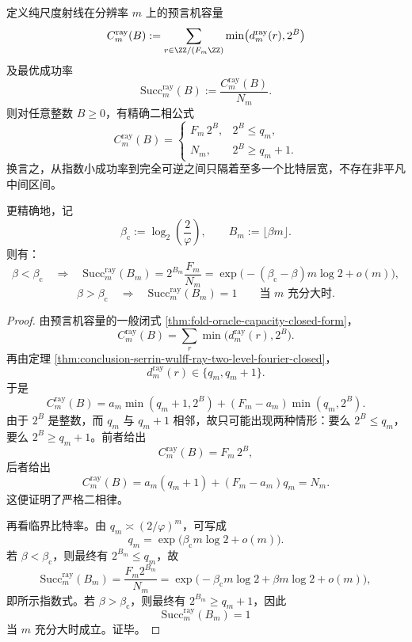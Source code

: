 \begin{theorem}\label{thm:conclusion-serrin-wulff-ray-onebit-capacity-transition}
定义纯尺度射线在分辨率 \(m\) 上的预言机容量
\[
C_m^{\mathrm{ray}}(B)
:=
\sum_{r\in \ZZ/(F_m\ZZ)}
\min\bigl(d_m^{\mathrm{ray}}(r),2^B\bigr)
\]
及最优成功率
\[
\mathrm{Succ}_m^{\mathrm{ray}}(B):=\frac{C_m^{\mathrm{ray}}(B)}{N_m}.
\]
则对任意整数 \(B\ge 0\)，有精确二相公式
\[
C_m^{\mathrm{ray}}(B)=
\begin{cases}
F_m\,2^B, & 2^B\le q_m,\\[4pt]
N_m, & 2^B\ge q_m+1.
\end{cases}
\]
换言之，从指数小成功率到完全可逆之间只隔着至多一个比特层宽，不存在非平凡中间区间。

更精确地，记
\[
\beta_{\mathrm c}:=\log_2\!\left(\frac2\varphi\right),
\qquad
B_m:=\lfloor \beta m\rfloor.
\]
则有：
\[
\beta<\beta_{\mathrm c}
\quad\Longrightarrow\quad
\mathrm{Succ}_m^{\mathrm{ray}}(B_m)
=
2^{B_m}\frac{F_m}{N_m}
=
\exp\!\bigl(-(\beta_{\mathrm c}-\beta)m\log 2+o(m)\bigr),
\]
\[
\beta>\beta_{\mathrm c}
\quad\Longrightarrow\quad
\mathrm{Succ}_m^{\mathrm{ray}}(B_m)=1
\qquad
\text{当 \(m\) 充分大时}.
\]
\end{theorem}
\begin{proof}
由预言机容量的一般闭式 \ref{thm:fold-oracle-capacity-closed-form}，
\[
C_m^{\mathrm{ray}}(B)
=
\sum_r \min\bigl(d_m^{\mathrm{ray}}(r),2^B\bigr).
\]
再由定理 \ref{thm:conclusion-serrin-wulff-ray-two-level-fourier-closed}，
\[
d_m^{\mathrm{ray}}(r)\in\{q_m,q_m+1\}.
\]
于是
\[
C_m^{\mathrm{ray}}(B)
=
a_m\min(q_m+1,2^B)+(F_m-a_m)\min(q_m,2^B).
\]
由于 \(2^B\) 是整数，而 \(q_m\) 与 \(q_m+1\) 相邻，故只可能出现两种情形：要么 \(2^B\le q_m\)，要么 \(2^B\ge q_m+1\)。前者给出
\[
C_m^{\mathrm{ray}}(B)=F_m\,2^B,
\]
后者给出
\[
C_m^{\mathrm{ray}}(B)=a_m(q_m+1)+(F_m-a_m)q_m=N_m.
\]
这便证明了严格二相律。

再看临界比特率。由 \(q_m\asymp (2/\varphi)^m\)，可写成
\[
q_m=\exp\!\bigl(\beta_{\mathrm c}m\log2+o(m)\bigr).
\]
若 \(\beta<\beta_{\mathrm c}\)，则最终有 \(2^{B_m}\le q_m\)，故
\[
\mathrm{Succ}_m^{\mathrm{ray}}(B_m)
=
\frac{F_m2^{B_m}}{N_m}
=
\exp\!\bigl(-\beta_{\mathrm c}m\log2+\beta m\log2+o(m)\bigr),
\]
即所示指数式。若 \(\beta>\beta_{\mathrm c}\)，则最终有 \(2^{B_m}\ge q_m+1\)，因此
\[
\mathrm{Succ}_m^{\mathrm{ray}}(B_m)=1
\]
当 \(m\) 充分大时成立。证毕。
\end{proof}


